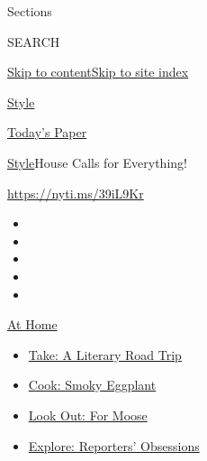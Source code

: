 Sections

SEARCH

\protect\hyperlink{site-content}{Skip to
content}\protect\hyperlink{site-index}{Skip to site index}

\href{https://www.nytimes3xbfgragh.onion/section/style}{Style}

\href{https://myaccount.nytimes3xbfgragh.onion/auth/login?response_type=cookie\&client_id=vi}{}

\href{https://www.nytimes3xbfgragh.onion/section/todayspaper}{Today's
Paper}

\href{/section/style}{Style}\textbar{}House Calls for Everything!

\href{https://nyti.ms/39iL9Kr}{https://nyti.ms/39iL9Kr}

\begin{itemize}
\item
\item
\item
\item
\item
\end{itemize}

\href{https://www.nytimes3xbfgragh.onion/spotlight/at-home?action=click\&pgtype=Article\&state=default\&region=TOP_BANNER\&context=at_home_menu}{At
Home}

\begin{itemize}
\tightlist
\item
  \href{https://www.nytimes3xbfgragh.onion/2020/07/28/books/time-for-a-literary-road-trip.html?action=click\&pgtype=Article\&state=default\&region=TOP_BANNER\&context=at_home_menu}{Take:
  A Literary Road Trip}
\item
  \href{https://www.nytimes3xbfgragh.onion/2020/07/29/magazine/bored-with-your-home-cooking-some-smoky-eggplant-will-fix-that.html?action=click\&pgtype=Article\&state=default\&region=TOP_BANNER\&context=at_home_menu}{Cook:
  Smoky Eggplant}
\item
  \href{https://www.nytimes3xbfgragh.onion/2020/07/27/travel/moose-michigan-isle-royale.html?action=click\&pgtype=Article\&state=default\&region=TOP_BANNER\&context=at_home_menu}{Look
  Out: For Moose}
\item
  \href{https://www.nytimes3xbfgragh.onion/interactive/2020/at-home/even-more-reporters-editors-diaries-lists-recommendations.html?action=click\&pgtype=Article\&state=default\&region=TOP_BANNER\&context=at_home_menu}{Explore:
  Reporters' Obsessions}
\end{itemize}

